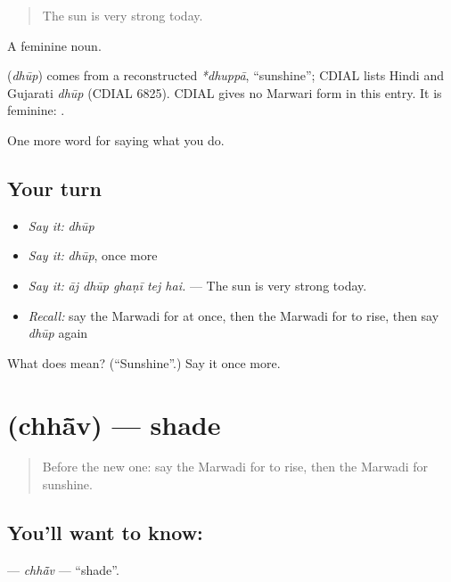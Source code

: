\begin{quote}
The sun is very strong today.
\end{quote}

A feminine noun.

\begin{cousinweb}
\textbf{} (\emph{dhūp}) comes from a reconstructed \emph{*dhuppā}, \textquotedblleft{}sunshine\textquotedblright{}; CDIAL lists Hindi and Gujarati \emph{dhūp} (CDIAL 6825). CDIAL gives no Marwari form in this entry. It is feminine: \textbf{   }.
\end{cousinweb}

\begin{grammarlens}[title={What you've built}]
One more word for saying what you do.
\end{grammarlens}

\subsection*{Your turn}
\begin{itemize}
\raggedright
  \item \emph{Say it:} \emph{dhūp}
  \item \emph{Say it:} \emph{dhūp}, once more
  \item \emph{Say it:} \emph{āj dhūp ghaṇī tej hai.} — The sun is very strong today.
  \item \emph{Recall:} say the Marwadi for at once, then the Marwadi for to rise, then say \emph{dhūp} again
\end{itemize}

\begin{tcolorbox}[breakable,colback=teal!4,colframe=teal!35!black,title={Before you move on}]
What does  mean? (\textquotedblleft{}Sunshine\textquotedblright{}.) Say it once more.
\end{tcolorbox}
\section[\texorpdfstring{\mw{छांव} (chhā̃v)}{छांव (chhā̃v)}]{ (chhā̃v) — shade}

\label{lesson:MW-C168-chhav}



\begin{quote}
Before the new one: say the Marwadi for to rise, then the Marwadi for sunshine.
\end{quote}

\subsection*{You'll want to know: }
\textbf{} — \emph{chhā̃v} — \textquotedblleft{}shade\textquotedblright{}.


